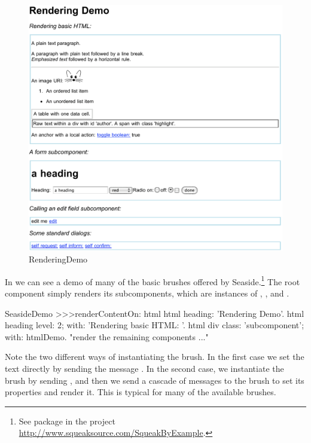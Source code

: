 \documentclass[a4paper,10pt,twoside]{book}
\begin{document}
\begin{figure}[ht]
\begin{center}
\includegraphics[width=\textwidth]{RenderingDemo}
\caption{RenderingDemo}
\label{fig:RenderingDemo}
\end{center}
\end{figure}

In  we can see a demo of many of the basic brushes offered by Seaside.\footnote{See package  in the project \url{http://www.squeaksource.com/SqueakByExample}.}
The root component  simply renders its subcomponents, which are instances of , ,  and .

\begin{code}{}
SeasideDemo >>>renderContentOn: html
	html heading: 'Rendering Demo'.
	html heading
		level: 2;
		with: 'Rendering basic HTML: '.
	html div
		class: 'subcomponent';
		with: htmlDemo.
	"render the remaining components ..."
\end{code}

Note the two different ways of instantiating the  brush.
In the first case we set the text directly by sending the message .
In the second case, we instantiate the brush by sending , and then we send a cascade of messages to the brush to set its properties and render it.
This is typical for many of the available brushes.
\end{document}
